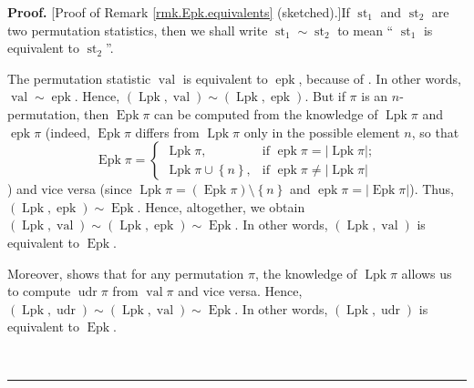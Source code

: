 \documentclass[numbers=enddot,12pt,final,onecolumn,notitlepage]{scrartcl}%
\theoremstyle{definition}
\newenvironment{proof}[1][Proof]{\noindent\textbf{#1.} }{\ \rule{0.5em}{0.5em}}
\newenvironment{verlong}{}{}
\begin{document}
\begin{proof}
[Proof of Remark \ref{rmk.Epk.equivalents} (sketched).]If
$\operatorname{st}_1$ and $\operatorname{st}_2$ are two permutation
statistics, then we shall write
$\operatorname{st}_1 \sim\operatorname{st}_2$ to mean \textquotedblleft%
$\operatorname{st}_1$ is equivalent to
$\operatorname{st}_2$\textquotedblright.

The permutation statistic $\operatorname{val}$ is equivalent to
$\operatorname*{epk}$, because of \cite[Lemma 2.1 \textbf{(e)}]{part1}. In
other words, $\operatorname{val}\sim\operatorname*{epk}$. Hence, $\left(
\operatorname*{Lpk},\operatorname{val}\right)  \sim\left(
\operatorname*{Lpk},\operatorname*{epk}\right)  $. But if $\pi$ is an
$n$-permutation, then $\operatorname{Epk}\pi$ can be computed from the
knowledge of $\operatorname*{Lpk}\pi$ and $\operatorname*{epk}\pi$ (indeed,
$\operatorname{Epk}\pi$ differs from $\operatorname*{Lpk}\pi$ only in the
possible element $n$, so that
\[
\operatorname{Epk}\pi=%
\begin{cases}
\operatorname*{Lpk}\pi, & \text{if }\operatorname*{epk}\pi=\left\vert
\operatorname*{Lpk}\pi\right\vert ;\\
\operatorname*{Lpk}\pi\cup\left\{  n\right\}  , & \text{if }%
\operatorname*{epk}\pi\neq\left\vert \operatorname*{Lpk}\pi\right\vert
\end{cases}
\]
) and vice versa (since $\operatorname*{Lpk}\pi=\left(  \operatorname{Epk}
\pi\right)  \setminus\left\{  n\right\}  $ and $\operatorname{epk}
\pi=\left\vert \operatorname{Epk}\pi\right\vert $). Thus, $\left(
\operatorname{Lpk},\operatorname{epk}\right)  \sim\operatorname{Epk}$.
Hence, altogether, we obtain $\left(  \operatorname{Lpk},\operatorname{val}
\right)  \sim\left(  \operatorname*{Lpk},\operatorname*{epk}\right)
\sim\operatorname{Epk}$.
\begin{verlong}
In other words, $\left(  \operatorname*{Lpk}%
,\operatorname{val}\right)  $ is equivalent to $\operatorname{Epk}$.
\end{verlong}

Moreover, \cite[Lemma 2.2 \textbf{(a)}]{part1} shows that
for any permutation $\pi$, the
knowledge of $\operatorname*{Lpk}\pi$ allows us to compute
$\operatorname*{udr}\pi$ from $\operatorname{val}\pi$ and vice versa. Hence,
$\left(  \operatorname*{Lpk},\operatorname*{udr}\right)  \sim\left(
\operatorname*{Lpk},\operatorname{val}\right)  \sim\operatorname{Epk}$.
\begin{verlong}
In
other words, $\left(  \operatorname*{Lpk},\operatorname*{udr}\right)  $ is
equivalent to $\operatorname{Epk}$.
\end{verlong}


\end{proof}
\end{document}

